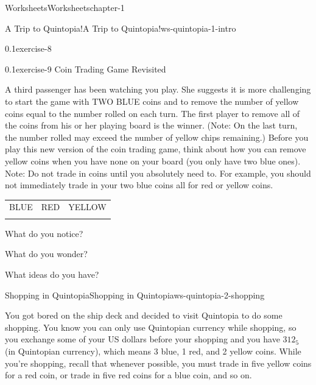 \documentclass[twoside,11pt,]{book}
\begin{document}
\begin{chapterptx}{Worksheets}{}{Worksheets}{}{}{chapter-1}
\begin{worksheet-section-numberless}{A Trip to Quintopia!}{}{A Trip to Quintopia!}{}{}{ws-quintopia-1-intro}
\begin{divisionexercise}{1}{}{0.1}{exercise-8}
\end{divisionexercise}%
\clearpage
\begin{divisionexercise}{2}{}{0.1}{exercise-9}%
\hypertarget{p-19}{}%
Coin Trading Game Revisited%
\par
\hypertarget{p-20}{}%
A third passenger has been watching you play.  She suggests it is more challenging to start the game with TWO BLUE coins and to remove the number of yellow coins equal to the number rolled on each turn.  The first player to remove all of the coins from his or her playing board is the winner.  (Note: On the last turn, the number rolled may exceed the number of yellow chips remaining.)  Before you play this new version of the coin trading game, think about how you can remove yellow coins when you have none on your board (you only have two blue ones).  Note: Do not trade in coins until you absolutely need to.  For example, you should not immediately trade in your two blue coins all for red or yellow coins.%
\begin{table}
\centering
\begin{tabular}{lll}
BLUE&RED&YELLOW\tabularnewline[0pt]
&&
\end{tabular}
\end{table}
\hypertarget{p-21}{}%
What do you notice?%
\par
\hypertarget{p-22}{}%
What do you wonder?%
\par
\hypertarget{p-23}{}%
What ideas do you have?%
\end{divisionexercise}%
\end{worksheet-section-numberless}
\restoregeometry
%
%
\typeout{************************************************}
\typeout{************************************************}
%
\begin{worksheet-section-numberless}{Shopping in Quintopia}{}{Shopping in Quintopia}{}{}{ws-quintopia-2-shopping}
\begin{introduction}{}%
\hypertarget{p-24}{}%
You got bored on the ship deck and decided to visit Quintopia to do some shopping. You know you can only use Quintopian currency while shopping, so you exchange some of your US dollars before your shopping and you have \(312_{5}\) (in Quintopian currency), which means 3 blue, 1 red, and 2 yellow coins. While you’re shopping, recall that whenever possible, you must trade in five yellow coins for a red coin, or trade in five red coins for a blue coin, and so on.%
\end{introduction}%

\end{worksheet-section-numberless}
\end{chapterptx}
\end{document}
